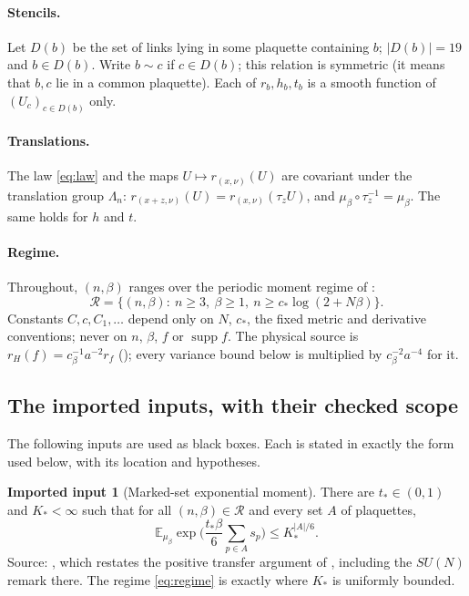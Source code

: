 \documentclass[11pt]{article}
\theoremstyle{definition}
\newtheorem{hypothesis}{Imported input}
\newcommand{\E}{\mathbb{E}}
\newcommand{\supp}{\operatorname{supp}}
\begin{document}
\paragraph{Stencils.} Let $D(b)$ be the set of links lying in some plaquette containing $b$; $|D(b)|=19$ and
$b\in D(b)$. Write $b\sim c$ if $c\in D(b)$; this relation is symmetric (it means that $b,c$ lie in a common
plaquette). Each of $r_b,h_b,t_b$ is a smooth function of $(U_c)_{c\in D(b)}$ only.

\paragraph{Translations.} The law \eqref{eq:law} and the maps $U\mapsto r_{(x,\nu)}(U)$ are covariant under the
translation group $\Lambda_n$: $r_{(x+z,\nu)}(U)=r_{(x,\nu)}(\tau_zU)$, and $\mu_\beta\circ\tau_z^{-1}=\mu_\beta$.
The same holds for $h$ and $t$.

\paragraph{Regime.} Throughout, $(n,\beta)$ ranges over the periodic moment regime of \cite[periodic regime display]{cur}:
\begin{equation}\label{eq:regime}
\mathcal R=\{(n,\beta):\ n\ge3,\ \beta\ge1,\ n\ge c_*\log(2+N\beta)\}.
\end{equation}
Constants $C,c,C_1,\dots$ depend only on $N$, $c_*$, the fixed metric and derivative conventions; never on
$n$, $\beta$, $f$ or $\supp f$. The physical source is $r_H(f)=c_\beta^{-1}a^{-2}r_f$ (\cite[Casimir and physical-factor display]{bhi});
every variance bound below is multiplied by $c_\beta^{-2}a^{-4}$ for it.

\subsection{The imported inputs, with their checked scope}

The following inputs are used as black boxes. Each is stated in exactly the form used below, with its location
and hypotheses.

\begin{hypothesis}[Marked-set exponential moment]\label{I1}
There are $t_*\in(0,1)$ and $K_*<\infty$ such that for all $(n,\beta)\in\mathcal R$ and every set $A$ of
plaquettes,
\[
\E_{\mu_\beta}\exp\Big(\frac{t_*\beta}{6}\sum_{p\in A}s_p\Big)\le K_*^{|A|/6}.
\]
Source: \cite[subsection ``The actual multiplaquette input'']{inn}, which restates the positive transfer
argument of \cite{sbr}, including the $SU(N)$ remark there. The regime \eqref{eq:regime} is exactly where $K_*$ is
uniformly bounded.
\end{hypothesis}
\end{document}
